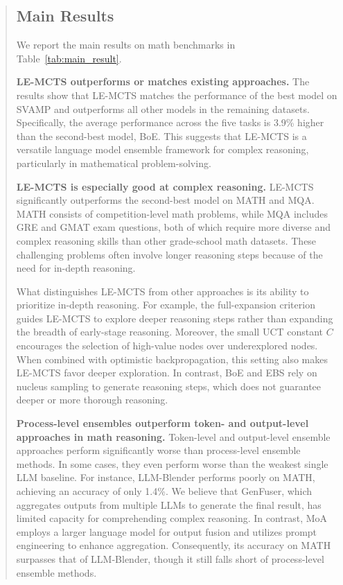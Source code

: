 \documentclass[11pt]{article}
\begin{document}
\begin{abstract}
\subsection{Main Results}
\label{text:experiment:main_results}
We report the main results on math benchmarks in Table~\ref{tab:main_result}.
\medskip
\par \noindent \textbf{LE-MCTS outperforms or matches existing approaches.} \;
The results show that LE-MCTS matches the performance of the best model on SVAMP and outperforms all other models in the remaining datasets. 
Specifically, the average performance across the five tasks is 3.9\% higher than the second-best model, BoE. 
This suggests that LE-MCTS is a versatile language model ensemble framework for complex reasoning, particularly in mathematical problem-solving.
\medskip
\par \noindent \textbf{LE-MCTS is especially good at complex reasoning.} \;
LE-MCTS significantly outperforms the second-best model on MATH and MQA. 
MATH consists of competition-level math problems, while MQA includes GRE and GMAT exam questions, both of which require more diverse and complex reasoning skills than other grade-school math datasets. 
These challenging problems often involve longer reasoning steps because of the need for in-depth reasoning.


What distinguishes LE-MCTS from other approaches is its ability to prioritize in-depth reasoning. 
For example, the full-expansion criterion guides LE-MCTS to explore deeper reasoning steps rather than expanding the breadth of early-stage reasoning. 
Moreover, the small UCT constant \( C \) encourages the selection of high-value nodes over underexplored nodes. 
When combined with optimistic backpropagation, this setting also makes LE-MCTS favor deeper exploration.
In contrast, BoE and EBS rely on nucleus sampling to generate reasoning steps, which does not guarantee deeper or more thorough reasoning.
\medskip
\par \noindent \textbf{Process-level ensembles outperform token- and output-level approaches in math reasoning.} \;
Token-level and output-level ensemble approaches perform significantly worse than process-level ensemble methods. 
In some cases, they even perform worse than the weakest single LLM baseline.
For instance, LLM-Blender performs poorly on MATH, achieving an accuracy of only 1.4\%. 
We believe that GenFuser, which aggregates outputs from multiple LLMs to generate the final result, has limited capacity for comprehending complex reasoning.
In contrast, MoA employs a larger language model for output fusion and utilizes prompt engineering to enhance aggregation. 
Consequently, its accuracy on MATH surpasses that of LLM-Blender, though it still falls short of process-level ensemble methods. 


\end{abstract}
\end{document}
